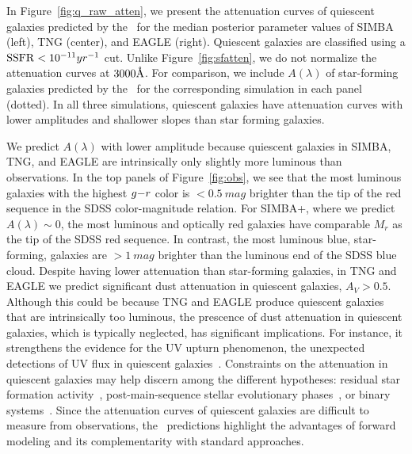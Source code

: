In Figure~\ref{fig:q_raw_atten}, we present the attenuation curves of
quiescent galaxies predicted by the \eda~for the median posterior parameter
values of SIMBA (left), TNG (center), and EAGLE (right). 
Quiescent galaxies are classified using a ${\rm SSFR} < 10^{-11}{yr}^{-1}$ cut. 
Unlike Figure~\ref{fig:sfatten}, we do not normalize the attenuation curves at
$3000\AA$.  
For comparison, we include $A(\lambda)$ of star-forming galaxies predicted
by the \eda~for the corresponding simulation in each panel (dotted).
In all three simulations, quiescent galaxies have attenuation curves with
lower amplitudes and shallower slopes than star forming galaxies.

We predict $A(\lambda)$ with lower amplitude because quiescent galaxies in
SIMBA, TNG, and EAGLE are intrinsically only slightly more luminous than observations. 
In the top panels of Figure~\ref{fig:obs}, we see that the most luminous
galaxies with the highest $g{-}r$ color is $<0.5~mag$ brighter than the tip of
the red sequence in the SDSS color-magnitude relation. 
For SIMBA+\eda, where we predict $A(\lambda) \sim 0$, the most luminous and
optically red galaxies have comparable $M_r$ as the tip of the SDSS red sequence.
In contrast, the most luminous blue, star-forming, galaxies are $>1~mag$
brighter than the luminous end of the SDSS blue cloud.
Despite having lower attenuation than star-forming galaxies, in TNG and
EAGLE we predict significant dust attenuation in quiescent galaxies, $A_V > 0.5$.
Although this could be because TNG and EAGLE produce quiescent galaxies that
are intrinsically too luminous, the prescence of dust attenuation in quiescent
galaxies, which is typically neglected, has significant implications.  
For instance, it strengthens the evidence for the UV upturn phenomenon, the
unexpected detections of UV flux in quiescent galaxies~\citep[\eg][]{code1969,
oconnell1999, lecras2016, ali2018, dantas2021}. 
Constraints on the attenuation in quiescent galaxies may help discern
among the different hypotheses: residual star formation
activity~\citep[\eg~][]{kaviraj2007}, post-main-sequence stellar evolutionary
phases~\citep[\eg~][]{yi1997}, or binary systems~\citep[\eg~][]{han2007}.
Since the attenuation curves of quiescent galaxies are difficult to measure
from observations, the \eda~predictions highlight the advantages of
forward modeling and its complementarity with standard approaches. 

